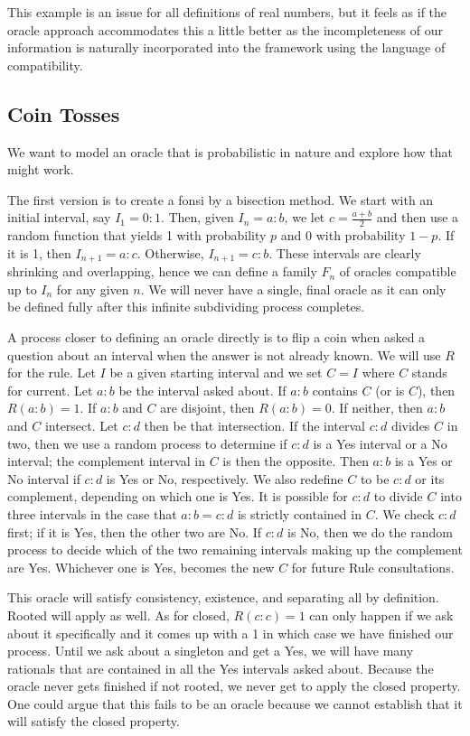 \documentclass[12pt]{article}
\begin{document}
This example is an issue for all definitions of real numbers, but it feels as if the oracle approach accommodates this a little better as the incompleteness of our information is naturally incorporated into the framework using the language of compatibility.

\subsection{Coin Tosses}

We want to model an oracle that is probabilistic in nature and explore how that might work. 

The first version is to create a fonsi by a bisection method. We start with an initial interval, say $I_1 = 0:1$. Then, given $I_n = a:b$, we let $c = \tfrac{a+b}{2}$ and then use a random function that yields 1 with probability $p$ and 0 with probability $1-p$. If it is 1, then $I_{n+1} = a:c$. Otherwise, $I_{n+1} = c:b$. These intervals are clearly shrinking and overlapping, hence we can define a family $F_n$ of oracles compatible up to $I_n$ for any given $n$. We will never have a single, final oracle as it can only be defined fully after this infinite subdividing process completes. 

A process closer to defining an oracle directly is to flip a coin when asked a question about an interval when the answer is not already known. We will use $R$ for the rule. Let $I$ be a given starting interval and we set $C=I$ where $C$ stands for current. Let $a:b$ be the interval asked about. If $a:b$ contains $C$ (or is $C$), then $R(a:b) = 1$. If $a:b$ and $C$ are disjoint, then $R(a:b) = 0$. If neither, then $a:b$ and $C$ intersect. Let $c:d$ then be that intersection. If the interval $c:d$ divides $C$ in two, then we use a random process to determine if $c:d$ is a Yes interval or a No interval; the complement interval in $C$ is then the opposite. Then $a:b$ is a Yes or No interval if $c:d$ is Yes or No, respectively. We also redefine $C$ to be $c:d$ or its complement, depending on which one is Yes. It is possible for $c:d$ to divide $C$ into three intervals in the case that $a:b=c:d$ is strictly contained in $C$. We check $c:d$ first; if it is Yes, then the other two are No. If $c:d$ is No, then we do the random process to decide which of the two remaining intervals making up the complement are Yes. Whichever one is Yes, becomes the new $C$ for future Rule consultations.  

This oracle will satisfy consistency, existence, and separating all by definition. Rooted will apply as well. As for closed, $R(c:c)=1$ can only happen if we ask about it specifically and it comes up with a 1 in which case we have finished our process. Until we ask about a singleton and get a Yes, we will have many rationals that are contained in all the Yes intervals asked about. Because the oracle never gets finished if not rooted, we never get to apply the closed property. One could argue that this fails to be an oracle because we cannot establish that it will satisfy the closed property. 
\end{document}

